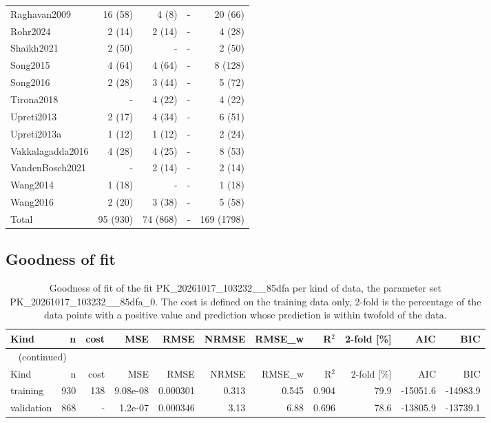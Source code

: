 \documentclass{article}
\begin{document}
\begin{longtable}{lrrrr}
Raghavan2009 & 16 (58) & 4 (8) & - & 20 (66) \\
Rohr2024 & 2 (14) & 2 (14) & - & 4 (28) \\
Shaikh2021 & 2 (50) & - & - & 2 (50) \\
Song2015 & 4 (64) & 4 (64) & - & 8 (128) \\
Song2016 & 2 (28) & 3 (44) & - & 5 (72) \\
Tirona2018 & - & 4 (22) & - & 4 (22) \\
Upreti2013 & 2 (17) & 4 (34) & - & 6 (51) \\
Upreti2013a & 1 (12) & 1 (12) & - & 2 (24) \\
Vakkalagadda2016 & 4 (28) & 4 (25) & - & 8 (53) \\
VandenBosch2021 & - & 2 (14) & - & 2 (14) \\
Wang2014 & 1 (18) & - & - & 1 (18) \\
Wang2016 & 2 (20) & 3 (38) & - & 5 (58) \\
Total & 95 (930) & 74 (868) & - & 169 (1798) \\
\end{longtable}

\subsection{Goodness of fit}

\begin{longtable}{lrrrrrrrrrr}
\caption{Goodness of fit of the fit PK\_20261017\_103232\_\_85dfa per kind of data, the parameter set PK\_20261017\_103232\_\_85dfa\_0. The cost is defined on the training data only, 2-fold is the percentage of the data points with a positive value and prediction whose prediction is within twofold of the data.}\label{tab:metrics:PK_20261017_103232__85dfa} \\
\toprule
Kind & n & cost & MSE & RMSE & NRMSE & RMSE\_w & R\ensuremath{^{2}} & 2-fold [\%] & AIC & BIC \\
\midrule
\endfirsthead
\multicolumn{11}{l}{\small\tablename~\thetable{} (continued)} \\
\toprule
Kind & n & cost & MSE & RMSE & NRMSE & RMSE\_w & R\ensuremath{^{2}} & 2-fold [\%] & AIC & BIC \\
\midrule
\endhead
\bottomrule
\endlastfoot
training & 930 & 138 & 9.08e-08 & 0.000301 & 0.313 & 0.545 & 0.904 & 79.9 & -15051.6 & -14983.9 \\
validation & 868 & - & 1.2e-07 & 0.000346 & 3.13 & 6.88 & 0.696 & 78.6 & -13805.9 & -13739.1 \\
\end{longtable}
\end{document}
